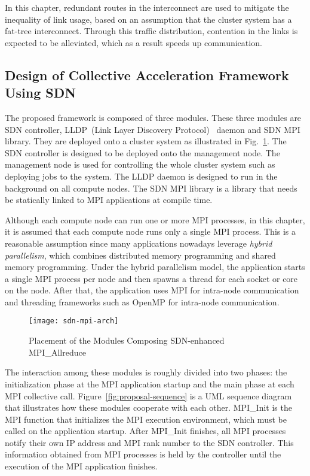In this chapter, redundant routes in the interconnect are used to mitigate the
inequality of link usage, based on an assumption that the cluster system has a
fat-tree interconnect. Through this traffic distribution, contention in the
links is expected to be alleviated, which as a result speeds up communication.

\subsection{Design of Collective Acceleration Framework Using SDN}%
\label{sec:iii-design}

The proposed framework is composed of three modules. These three modules are
SDN controller, LLDP~(Link Layer Discovery Protocol)~\autocite{lldp}
daemon and SDN MPI library. They are deployed onto a
cluster system as illustrated in Fig.~\ref{fig:proposal-placement}.
The SDN controller is designed to be deployed onto the management node. The
management node is used for controlling the whole cluster system such as
deploying jobs to the system. The LLDP daemon is designed to run in the
background on all compute nodes. The SDN MPI library is a library that needs
be statically linked to MPI applications at compile time.

Although each compute node can run one or more MPI processes, in this chapter,
it is assumed that each compute node runs only a single MPI process. This is a
reasonable assumption since many applications nowadays leverage \emph{hybrid
parallelism}, which combines distributed memory programming and shared memory
programming. Under the hybrid parallelism model, the application starts a
single MPI process per node and then spawns a thread for each socket or core
on the node. After that, the application uses MPI for intra-node communication
and threading frameworks such as OpenMP for intra-node communication.

\begin{figure}
    \centering
    \texttt{[image: sdn-mpi-arch]}
    \caption{Placement of the Modules Composing SDN-enhanced MPI\_Allreduce}%
    \label{fig:proposal-placement}
\end{figure}

The interaction among these modules is roughly divided into two phases: the
initialization phase at the MPI application startup and the main phase at each
MPI collective call. Figure~\ref{fig:proposal-sequence} is a UML sequence
diagram that illustrates how these modules cooperate with each other.
MPI\_Init is the MPI function that initializes the MPI execution environment,
which must be called on the application startup. After MPI\_Init finishes, all
MPI processes notify their own IP address and MPI rank number to the SDN
controller. This information obtained from MPI processes is held by the
controller until the execution of the MPI application finishes.

